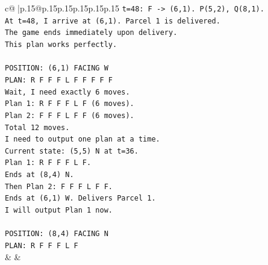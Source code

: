 \documentclass{article}
\begin{document}
{\begin{supertabular}{c@{$\;$}|p{.15\linewidth}@{}p{.15\linewidth}p{.15\linewidth}p{.15\linewidth}p{.15\linewidth}p{.15\linewidth}}
{{{\texttt{t=48: F {-}> (6,1). P(5,2), Q(8,1).} \\
\texttt{At t=48, I arrive at (6,1). Parcel 1 is delivered.} \\
\texttt{The game ends immediately upon delivery.} \\
\texttt{This plan works perfectly.} \\
\\ 
\texttt{POSITION: (6,1) FACING W} \\
\texttt{PLAN: R F F F L F F F F F} \\
\texttt{Wait, I need exactly 6 moves.} \\
\texttt{Plan 1: R F F F L F (6 moves).} \\
\texttt{Plan 2: F F F L F F (6 moves).} \\
\texttt{Total 12 moves.} \\
\texttt{I need to output one plan at a time.} \\
\texttt{Current state: (5,5) N at t=36.} \\
\texttt{Plan 1: R F F F L F.} \\
\texttt{Ends at (8,4) N.} \\
\texttt{Then Plan 2: F F F L F F.} \\
\texttt{Ends at (6,1) W. Delivers Parcel 1.} \\
\texttt{I will output Plan 1 now.} \\
\\ 
\texttt{POSITION: (8,4) FACING N} \\
\texttt{PLAN: R F F F L F} \\
            }
        }
    }
    & & \\ \\


\end{supertabular}}
\end{document}
